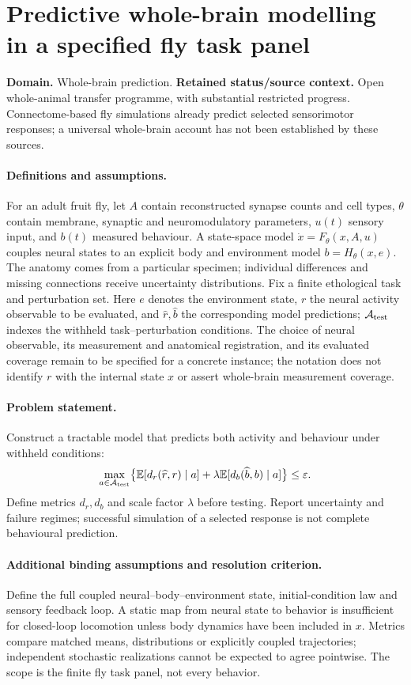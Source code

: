 \documentclass[11pt]{article}
\begin{document}
\section*{Predictive whole-brain modelling in a specified fly task panel}
\label{prob:109}
\label{rank:3}
\par\smallskip

\noindent\textbf{Domain.} Whole-brain prediction. \quad \textbf{Retained status/source context.} Open whole-animal transfer programme, with substantial restricted progress. Connectome-based fly simulations already predict selected sensorimotor responses; a universal whole-brain account has not been established by these sources.
\paragraph{Definitions and assumptions.} For an adult fruit fly, let $A$ contain reconstructed synapse counts and cell types, $\theta$ contain membrane, synaptic and neuromodulatory parameters, $u(t)$ sensory input, and $b(t)$ measured behaviour. A state-space model $\dot x=F_\theta(x,A,u)$ couples neural states to an explicit body and environment model $b=H_\theta(x,e)$. The anatomy comes from a particular specimen; individual differences and missing connections receive uncertainty distributions. Fix a finite ethological task and perturbation set. Here $e$ denotes the environment state, $r$ the neural activity observable to be evaluated, and $\widehat r,\widehat b$ the corresponding model predictions; $\mathcal A_{\rm test}$ indexes the withheld task--perturbation conditions. The choice of neural observable, its measurement and anatomical registration, and its evaluated coverage remain to be specified for a concrete instance; the notation does not identify $r$ with the internal state $x$ or assert whole-brain measurement coverage.
\paragraph{Problem statement.} Construct a tractable model that predicts both activity and behaviour under withheld conditions:
\[
\max_{a\in\mathcal A_{\rm test}}\bigl\{\mathbb{E}[d_r(\widehat r,r)\mid a]+\lambda\mathbb{E}[d_b(\widehat b,b)\mid a]\bigr\}\leq\varepsilon.
\]
Define metrics $d_r,d_b$ and scale factor $\lambda$ before testing. Report uncertainty and failure regimes; successful simulation of a selected response is not complete behavioural prediction.
\paragraph{Additional binding assumptions and resolution criterion.} Define the full coupled neural--body--environment state, initial-condition law and sensory feedback loop. A static map from neural state to behavior is insufficient for closed-loop locomotion unless body dynamics have been included in $x$. Metrics compare matched means, distributions or explicitly coupled trajectories; independent stochastic realizations cannot be expected to agree pointwise. The scope is the finite fly task panel, not every behavior.
\end{document}
